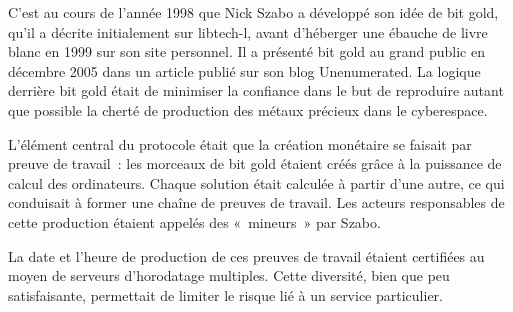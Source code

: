 C'est au cours de l'année 1998 que Nick Szabo a développé son idée de bit gold, qu'il a décrite initialement sur libtech-l, avant d'héberger une ébauche de livre blanc en 1999 sur son site personnel. Il a présenté bit gold au grand public en décembre 2005 dans un article publié sur son blog Unenumerated. La logique derrière bit gold était de minimiser la confiance dans le but de reproduire autant que possible la cherté de production des métaux précieux dans le cyberespace.

L'élément central du protocole était que la création monétaire se faisait par preuve de travail~: les morceaux de bit gold étaient créés grâce à la puissance de calcul des ordinateurs. Chaque solution était calculée à partir d'une autre, ce qui conduisait à former une chaîne de preuves de travail. Les acteurs responsables de cette production étaient appelés des «~mineurs~» par Szabo.


La date et l'heure de production de ces preuves de travail étaient certifiées au moyen de serveurs d'horodatage multiples. Cette diversité, bien que peu satisfaisante, permettait de limiter le risque lié à un service particulier.

